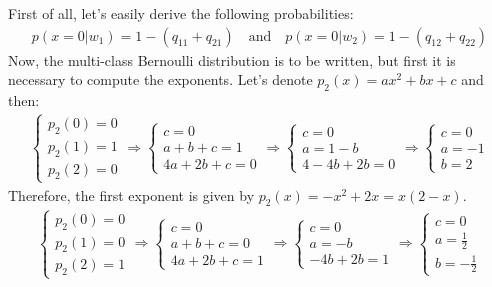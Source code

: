 \Answer[number={13}]
First of all, let's easily derive the following probabilities:
\begin{align*}
    p(x=0|w_1)=1-(q_{11}+q_{21})
    \quad\text{and}\quad
    p(x=0|w_2)=1-(q_{12}+q_{22})
\end{align*}
Now, the multi-class Bernoulli distribution is to be written, but first
it is necessary to compute the exponents. Let's denote
\(p_2(x)=ax^2+bx+c\) and then:
\begin{align*}
    \begin{cases}
        p_2(0)=0\\p_2(1)=1\\p_2(2)=0
    \end{cases}
    \Rightarrow
    \begin{cases}
        c=0\\a+b+c=1\\4a+2b+c=0
    \end{cases}
    \Rightarrow
    \begin{cases}
        c=0\\a=1-b\\4-4b+2b=0
    \end{cases}
    \Rightarrow
    \begin{cases}
        c=0\\a=-1\\b=2
    \end{cases}
\end{align*}
Therefore, the first exponent is given by \(p_2(x)=-x^2+2x=x(2-x)\).
\begin{align*}
    \begin{cases}
        p_2(0)=0\\p_2(1)=0\\p_2(2)=1
    \end{cases}
    \Rightarrow
    \begin{cases}
        c=0\\a+b+c=0\\4a+2b+c=1
    \end{cases}
    \Rightarrow
    \begin{cases}
        c=0\\a=-b\\-4b+2b=1
    \end{cases}
    \Rightarrow
    \begin{cases}
        c=0\\a=\frac{1}{2}\\b=-\frac{1}{2}
    \end{cases}
\end{align*}
